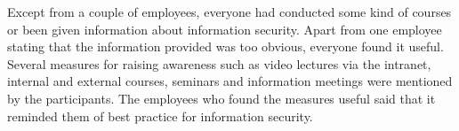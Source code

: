 Except from a couple of employees, everyone had conducted some kind of courses or been given information about information security. Apart from one employee stating that the information provided was too obvious, everyone found it useful. Several measures for raising awareness such as video lectures via the intranet, internal and external courses, seminars and information meetings were mentioned by the participants. The employees who found the measures useful said that it reminded them of best practice for information security.
